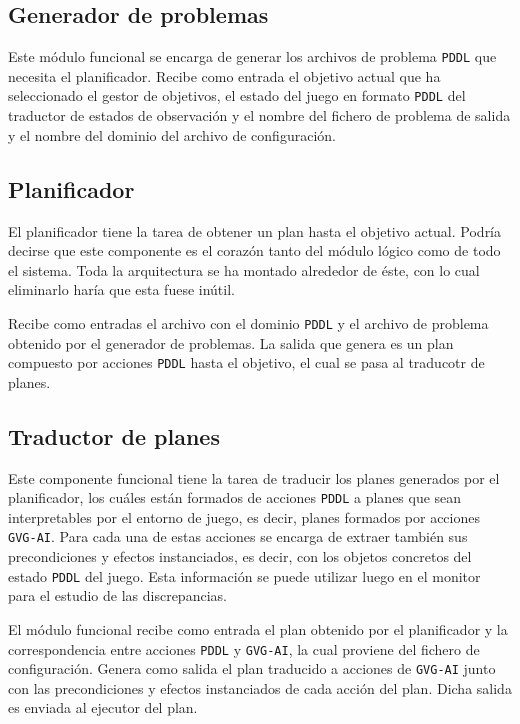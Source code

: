 \subsection{Generador de problemas}

Este módulo funcional se encarga de generar los archivos de problema \texttt{PDDL} que necesita
el planificador. Recibe como entrada el objetivo actual que ha seleccionado el gestor de objetivos,
el estado del juego en formato \texttt{PDDL} del traductor de estados de observación y el nombre del
fichero de problema de salida y el nombre del dominio del archivo de configuración.

\subsection{Planificador}

El planificador tiene la tarea de obtener un plan hasta el objetivo actual. Podría decirse que este
componente es el corazón tanto del módulo lógico como de todo el sistema. Toda la arquitectura se ha
montado alrededor de éste, con lo cual eliminarlo haría que esta fuese inútil.

Recibe como entradas el archivo con el dominio \texttt{PDDL} y el archivo de problema obtenido
por el generador de problemas. La salida que genera es un plan compuesto por acciones
\texttt{PDDL} hasta el objetivo, el cual se pasa al traducotr de planes.

\subsection{Traductor de planes}

Este componente funcional tiene la tarea de traducir los planes generados por el planificador,
los cuáles están formados de acciones \texttt{PDDL} a planes que sean interpretables por el entorno
de juego, es decir, planes formados por acciones \texttt{GVG-AI}. Para cada una de estas acciones
se encarga de extraer también sus precondiciones y efectos instanciados, es decir, con los objetos
concretos del estado \texttt{PDDL} del juego. Esta información se puede utilizar luego en el monitor
para el estudio de las discrepancias.

El módulo funcional recibe como entrada el plan obtenido por el planificador y la correspondencia
entre acciones \texttt{PDDL} y \texttt{GVG-AI}, la cual proviene del fichero de configuración. Genera
como salida el plan traducido a acciones de \texttt{GVG-AI} junto con las precondiciones y efectos
instanciados de cada acción del plan. Dicha salida es enviada al ejecutor del plan.

